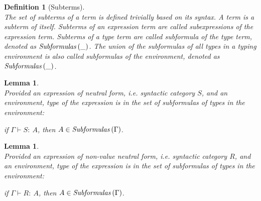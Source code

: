\documentclass[a4paper]{article}
\newcommand{\typecolor}{}
\newcommand{\termcolor}{}
\newcommand{\tp}[1]{{\typecolor #1}}
\newcommand{\tm}[1]{{\termcolor #1}}
\newtheorem{lemma}[theorem]{Lemma}
\newtheorem{definition}{Definition}
\newcommand{\env}{\tp{\Gamma}}
\newcommand{\typing}[2]{\tm{#1:\ }\tp{#2}}
\newcommand{\txt}[1]{\text{\textit{#1}}}
\newcommand{\subformulas}[1]{\txt{Subformulas}\,(#1)}
\begin{document}
\begin{definition}[Subterms]\ \\
The set of subterms of a term is defined trivially based on its
syntax. A term is a subterm of itself. Subterms of an expression term
are called subexpressions of the expression term. Subterms of a type
term are called subformula of the type term, denoted as
$\subformulas{\_}$. The union of the subformulas of all types in a typing
environment is also called subformulas of the environment, denoted as
$\subformulas{\_}$.
\end{definition}
 
\begin{lemma}\ \\
\label{sub_S}
Provided an expression of neutral form, i.e. syntactic category $S$,
and an environment, type of the expression is in the set of
subformulas of types in the environment:
 
 if $\env \vdash \typing{S}{A}$, then $A \in \subformulas{\Gamma}$.
\end{lemma}

\begin{lemma}\ \\
\label{sub_R}
Provided an expression of non-value neutral form, i.e. syntactic
category $R$, and an environment, type of the expression is in the set
of subformulas of types in the environment:
 
 if $\Gamma \vdash \typing{R}{A}$, then $A \in \subformulas{\Gamma}$.
\end{lemma}
 
\end{document}
